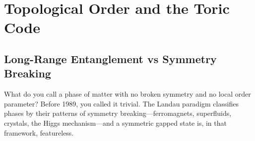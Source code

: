 %
%
%
%
%
%
%
%
%

\section{Topological Order and the Toric Code}
\label{sec:topological-order}

\subsection{Long-Range Entanglement vs Symmetry Breaking}
\label{subsec:lre-vs-symmetry-breaking}

What do you call a phase of matter with no broken symmetry and no local order parameter?  Before 1989, you called it trivial.  The Landau paradigm classifies phases by their patterns of symmetry breaking---ferromagnets, superfluids, crystals, the Higgs mechanism---and a symmetric gapped state is, in that framework, featureless.

